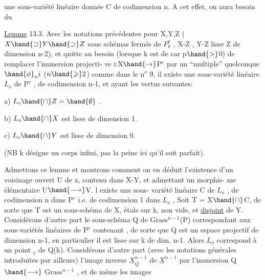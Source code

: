 
une sous-variété linéaire donnée C  de codimension n.  A cet effet,
on aura besoin du

\uline{Lemme} 13.3.  Avec les notations précédentes pour  X,Y,Z  ($X\hand{\supset} Y\hand{\supset} Z$
sous schémas fermés de $P^r_k$ , X-Z\hand{,} ,
Y-Z lisse \hand{,} Z de dimension \hand{$\leqslant$}n-2), et quitte
au besoin (lorsque k est de car p$\hand{>}$0)  de remplacer l'immersion projecti-%
ve  i:X$\hand{\rightarrow}$P$^r$  par  un ``multiple'' quelconque $\hand{\phi}_n i$ ($n \hand{\geqslant} 2$)  comme dans le
n$^o$ 9,  il existe une sous-variété linéaire  $L_o$ de P$^r$ , de codimension
n-1, et ayant les vertus suivantes:

a)  $L_o \hand{\cap} Z = \hand{\emptyset}$ .

b)  $L_o \hand{\cap} X$  est lisse de dimension 1.

c)  $L_o \hand{\cap} Y$   est lisse de dimension  0.

(NB  k désigne un corps infini, pas la peine ici qu'il soit parfait).

Admettons  ce lemme  et montrons comment on en déduit  l'existence
d'un voisinage ouvert U de x, contenu dans X-Y, et admettant un morphis-%
me élémentaire U$\hand{\longrightarrow}$V.  
 l existe une sous-%
variété linéaire C de $L_o$ , de codimension n dans P$^r$ i.e. de codimension
1 dans $L_o$ ,  
   
 Soit  T = X$\hand{\cap}$C, de sorte que T est un sous-schéma de X,
étale sur k, non vide, et \uline{disjoint} de Y.  Considérons d'autre part le
sous-schéma Q de Grass$^{n-1}$(P) correspondant aux sous-variétés linéaires
de P$^r$ contenant , de sorte que  Q est un  espace projectif
de dimension n-1,   en particulier il est lisse sur k de dim. n-1.
Alors $L_o$ correspond à un point \hand{$\xi$}$_o$ de Q(k).  Considérons d'autre part
(avec les notations générales introduites par ailleurs)  l'image inverse
$\underline{X}^{n-1}_Q$ de $\underline{X}^{n-1}$  par  l'immersion Q$\hand{\longrightarrow}$ Grass$^{n-1}$ , et de même les images

